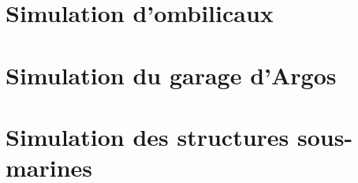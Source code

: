 		\section{Simulation d'ombilicaux}

			

		\section{Simulation du garage d'\gls{Argos}}

		\section{Simulation des structures sous-marines}
		